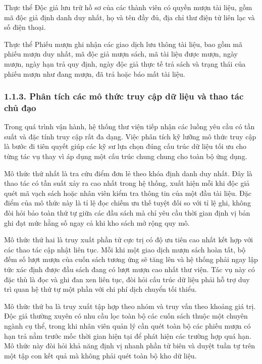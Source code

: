 \documentclass[14pt,a4paper]{extarticle}
\begin{document}
Thực thể Độc giả lưu trữ hồ sơ của các thành viên có quyền mượn tài liệu, gồm mã độc giả định danh duy nhất, họ và tên đầy đủ, địa chỉ thư điện tử liên lạc và số điện thoại.

Thực thể Phiếu mượn ghi nhận các giao dịch lưu thông tài liệu, bao gồm mã phiếu mượn duy nhất, mã độc giả mượn sách, mã tài liệu được mượn, ngày mượn, ngày hạn trả quy định, ngày độc giả thực tế trả sách và trạng thái của phiếu mượn như đang mượn, đã trả hoặc báo mất tài liệu.

\subsubsection*{1.1.3. Phân tích các mô thức truy cập dữ liệu và thao tác chủ đạo}

Trong quá trình vận hành, hệ thống thư viện tiếp nhận các luồng yêu cầu có tần suất và đặc tính truy cập rất đa dạng. Việc phân tích kỹ lưỡng mô thức truy cập là bước đi tiên quyết giúp các kỹ sư lựa chọn đúng cấu trúc dữ liệu tối ưu cho từng tác vụ thay vì áp dụng một cấu trúc chung chung cho toàn bộ ứng dụng.

Mô thức thứ nhất là tra cứu điểm đơn lẻ theo khóa định danh duy nhất. Đây là thao tác có tần suất xảy ra cao nhất trong hệ thống, xuất hiện mỗi khi độc giả quét mã vạch sách hoặc nhân viên kiểm tra thông tin của một đầu tài liệu. Đặc điểm của mô thức này là tỉ lệ đọc chiếm ưu thế tuyệt đối so với tỉ lệ ghi, không đòi hỏi bảo toàn thứ tự giữa các đầu sách mà chỉ yêu cầu thời gian định vị bản ghi đạt mức hằng số ngay cả khi kho sách mở rộng quy mô.

Mô thức thứ hai là truy xuất phần tử cực trị có độ ưu tiên cao nhất kết hợp với các thao tác cập nhật liên tục. Mỗi khi một giao dịch mượn sách hoàn tất, bộ đếm số lượt mượn của cuốn sách tương ứng sẽ tăng lên và hệ thống phải ngay lập tức xác định được đầu sách đang có lượt mượn cao nhất thư viện. Tác vụ này có đặc thù là đọc và ghi đan xen liên tục, đòi hỏi cấu trúc dữ liệu phải hỗ trợ duy trì quan hệ thứ tự một phần với chi phí dịch chuyển tối thiểu.

Mô thức thứ ba là truy xuất tập hợp theo nhóm và truy vấn theo khoảng giá trị. Độc giả thường xuyên có nhu cầu lọc toàn bộ các cuốn sách thuộc một chuyên ngành cụ thể, trong khi nhân viên quản lý cần quét toàn bộ các phiếu mượn có hạn trả nằm trước mốc thời gian hiện tại để phát hiện các trường hợp quá hạn. Mô thức này đòi hỏi khả năng định vị nhanh phần tử biên và duyệt tuần tự trên một tập con kết quả mà không phải quét toàn bộ kho dữ liệu.
\end{document}
